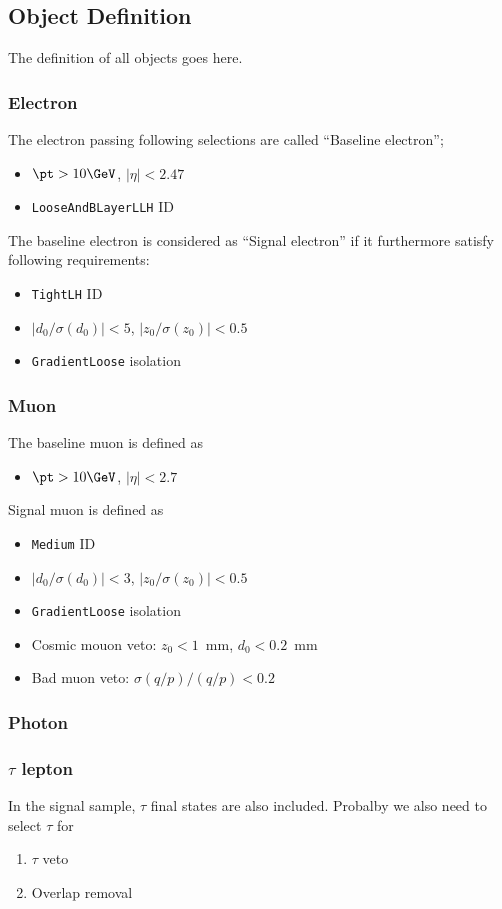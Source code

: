 \subsection{Object Definition}
The definition of all objects goes here.

\subsubsection{Electron}
The electron passing following selections are called ``Baseline electron'';
\begin{itemize}
  \item $\pt>10\GeV$, $|\eta|<2.47$
  \item \verb+LooseAndBLayerLLH+ ID
\end{itemize}

The baseline electron is considered as ``Signal electron'' if it furthermore satisfy following requirements:
\begin{itemize}
  \item \verb+TightLH+ ID
  \item $|d_0/\sigma(d_0)|<5$, $|z_0/\sigma(z_0)|<0.5$
  \item \verb+GradientLoose+ isolation
\end{itemize}

\subsubsection{Muon}
The baseline muon is defined as
\begin{itemize}
  \item $\pt>10\GeV$, $|\eta|<2.7$
\end{itemize}

Signal muon is defined as
\begin{itemize}
  \item \verb+Medium+ ID
  \item $|d_0/\sigma(d_0)|<3$, $|z_0/\sigma(z_0)|<0.5$
  \item \verb+GradientLoose+ isolation
  \item Cosmic mouon veto: $z_0<1$~mm, $d_0<0.2$~mm
  \item Bad muon veto: $\sigma(q/p)/(q/p)<0.2$
\end{itemize}

\subsubsection{Photon}

\subsubsection{$\tau$ lepton}
In the signal sample, $\tau$ final states are also included. Probalby we also need to select $\tau$ for
\begin{enumerate}
  \item $\tau$ veto
  \item Overlap removal
\end{enumerate}


